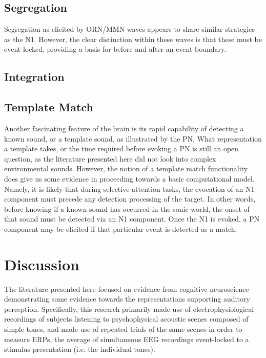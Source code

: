 \documentclass[a4paper,10pt,final]{ThesisStyle}
\begin{document}
\subsection{Segregation}

Segregation as elicited by ORN/MMN waves appears to share similar strategies as the N1.  However, the clear distinction within these waves is that these must be event locked, providing a basis for before and after an event boundary.  

\subsection{Integration}

\subsection{Template Match}

Another fascinating feature of the brain is its rapid capability of detecting a known sound, or a template sound, as illustrated by the PN.  What representation a template takes, or the time required before evoking a PN is still an open question, as the literature presented here did not look into complex environmental sounds.  However, the notion of a template match functionality does give us some evidence in proceeding towards a basic computational model.  Namely, it is likely that during selective attention tasks, the evocation of an N1 component must precede any detection processing of the target.  In other words, before knowing if a known sound has occurred in the sonic world, the onset of that sound must be detected via an N1 component.  Once the N1 is evoked, a PN component may be elicited if that particular event is detected as a match. 


\section{Discussion}

The literature presented here focused on evidence from cognitive neuroscience demonstrating some evidence towards the representations supporting auditory perception.  Specifically, this research primarily made use of electrophysiological recordings of subjects listening to psychophysical acoustic scenes composed of simple tones, and made use of repeated trials of the same scenes in order to measure ERPs, the average of simultaneous EEG recordings event-locked to a stimulus presentation (i.e. the individual tones).  
\end{document}
